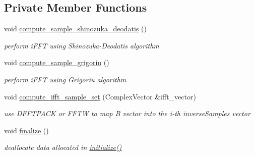 \subsection*{Private Member Functions}
\begin{DoxyCompactItemize}
\item 
void \hyperlink{classPecos_1_1FourierInverseTransformation_af228684696032356c68ba303e94ee62e}{compute\+\_\+sample\+\_\+shinozuka\+\_\+deodatis} ()\label{classPecos_1_1FourierInverseTransformation_af228684696032356c68ba303e94ee62e}

\begin{DoxyCompactList}\small\item\em perform i\+F\+FT using Shinozuka-\/\+Deodatis algorithm \end{DoxyCompactList}\item 
void \hyperlink{classPecos_1_1FourierInverseTransformation_a0f1ace07fbca48713f0a77b991d9f587}{compute\+\_\+sample\+\_\+grigoriu} ()\label{classPecos_1_1FourierInverseTransformation_a0f1ace07fbca48713f0a77b991d9f587}

\begin{DoxyCompactList}\small\item\em perform i\+F\+FT using Grigoriu algorithm \end{DoxyCompactList}\item 
void \hyperlink{classPecos_1_1FourierInverseTransformation_acf1c8578a2e83941e716ea08163ed0fc}{compute\+\_\+ifft\+\_\+sample\+\_\+set} (Complex\+Vector \&ifft\+\_\+vector)\label{classPecos_1_1FourierInverseTransformation_acf1c8578a2e83941e716ea08163ed0fc}

\begin{DoxyCompactList}\small\item\em use D\+F\+F\+T\+P\+A\+CK or F\+F\+TW to map B vector into the i-\/th inverse\+Samples vector \end{DoxyCompactList}\item 
void \hyperlink{classPecos_1_1FourierInverseTransformation_a32d626626eee0bc4ade146973f6abb1c}{finalize} ()\label{classPecos_1_1FourierInverseTransformation_a32d626626eee0bc4ade146973f6abb1c}

\begin{DoxyCompactList}\small\item\em deallocate data allocated in \hyperlink{classPecos_1_1FourierInverseTransformation_aff7310eaa8322a3eccf9815cc7da4a8e}{initialize()} \end{DoxyCompactList}\end{DoxyCompactItemize}
